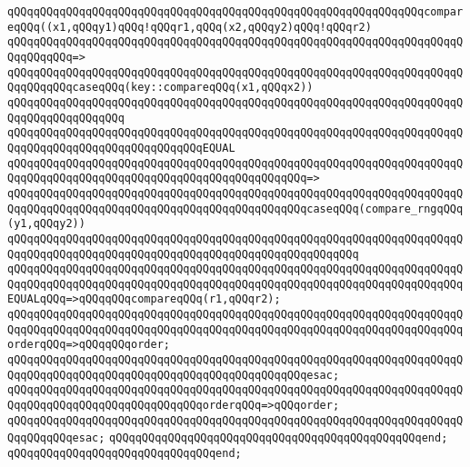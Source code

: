 \newline
\verb|qQQqqQQqqQQqqQQqqQQqqQQqqQQqqQQqqQQqqQQqqQQqqQQqqQQqqQQqqQQqqQQqcompareqQQq((x1,qQQqy1)qQQq!qQQqr1,qQQq(x2,qQQqy2)qQQq!qQQqr2)|\newline
\verb|qQQqqQQqqQQqqQQqqQQqqQQqqQQqqQQqqQQqqQQqqQQqqQQqqQQqqQQqqQQqqQQqqQQqqQQqqQQqqQQq=>|\newline
\verb|qQQqqQQqqQQqqQQqqQQqqQQqqQQqqQQqqQQqqQQqqQQqqQQqqQQqqQQqqQQqqQQqqQQqqQQqqQQqqQQqcaseqQQq(key::compareqQQq(x1,qQQqx2))|\newline
\verb|qQQqqQQqqQQqqQQqqQQqqQQqqQQqqQQqqQQqqQQqqQQqqQQqqQQqqQQqqQQqqQQqqQQqqQQqqQQqqQQqqQQqqQQq|\newline
\verb|qQQqqQQqqQQqqQQqqQQqqQQqqQQqqQQqqQQqqQQqqQQqqQQqqQQqqQQqqQQqqQQqqQQqqQQqqQQqqQQqqQQqqQQqqQQqqQQqqQQqEQUAL|\newline
\verb|qQQqqQQqqQQqqQQqqQQqqQQqqQQqqQQqqQQqqQQqqQQqqQQqqQQqqQQqqQQqqQQqqQQqqQQqqQQqqQQqqQQqqQQqqQQqqQQqqQQqqQQqqQQqqQQqqQQq=>|\newline
\verb|qQQqqQQqqQQqqQQqqQQqqQQqqQQqqQQqqQQqqQQqqQQqqQQqqQQqqQQqqQQqqQQqqQQqqQQqqQQqqQQqqQQqqQQqqQQqqQQqqQQqqQQqqQQqqQQqqQQqcaseqQQq(compare_rngqQQq(y1,qQQqy2))|\newline
\verb|qQQqqQQqqQQqqQQqqQQqqQQqqQQqqQQqqQQqqQQqqQQqqQQqqQQqqQQqqQQqqQQqqQQqqQQqqQQqqQQqqQQqqQQqqQQqqQQqqQQqqQQqqQQqqQQqqQQqqQQqqQQq|\newline
\verb|qQQqqQQqqQQqqQQqqQQqqQQqqQQqqQQqqQQqqQQqqQQqqQQqqQQqqQQqqQQqqQQqqQQqqQQqqQQqqQQqqQQqqQQqqQQqqQQqqQQqqQQqqQQqqQQqqQQqqQQqqQQqqQQqqQQqqQQqqQQqEQUALqQQq=>qQQqqQQqcompareqQQq(r1,qQQqr2);|\newline
\verb|qQQqqQQqqQQqqQQqqQQqqQQqqQQqqQQqqQQqqQQqqQQqqQQqqQQqqQQqqQQqqQQqqQQqqQQqqQQqqQQqqQQqqQQqqQQqqQQqqQQqqQQqqQQqqQQqqQQqqQQqqQQqqQQqqQQqqQQqqQQqorderqQQq=>qQQqqQQqorder;|\newline
\verb|qQQqqQQqqQQqqQQqqQQqqQQqqQQqqQQqqQQqqQQqqQQqqQQqqQQqqQQqqQQqqQQqqQQqqQQqqQQqqQQqqQQqqQQqqQQqqQQqqQQqqQQqqQQqqQQqqQQqesac;|\newline
\newline
\verb|qQQqqQQqqQQqqQQqqQQqqQQqqQQqqQQqqQQqqQQqqQQqqQQqqQQqqQQqqQQqqQQqqQQqqQQqqQQqqQQqqQQqqQQqqQQqqQQqqQQqorderqQQq=>qQQqorder;|\newline
\verb|qQQqqQQqqQQqqQQqqQQqqQQqqQQqqQQqqQQqqQQqqQQqqQQqqQQqqQQqqQQqqQQqqQQqqQQqqQQqqQQqesac;|\newline
\verb|qQQqqQQqqQQqqQQqqQQqqQQqqQQqqQQqqQQqqQQqqQQqqQQqend;|\newline
\verb|qQQqqQQqqQQqqQQqqQQqqQQqqQQqqQQqend;|\newline
